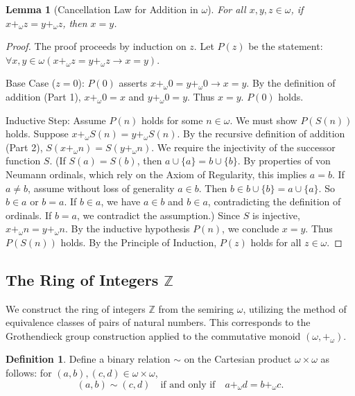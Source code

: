 \documentclass[11pt, a4paper]{article}
\theoremstyle{plain}
\newtheorem{lemma}[theorem]{Lemma}
\theoremstyle{definition}
\newtheorem{definition}[theorem]{Definition}
\numberwithin{equation}{section}
\newcommand{\Z}{\mathbb{Z}}
\begin{document}
\begin{lemma}[Cancellation Law for Addition in $\omega$]\label{lem:cancellation_omega}
For all $x, y, z \in \omega$, if $x+_\omega z = y+_\omega z$, then $x=y$.
\end{lemma}
\begin{proof}
The proof proceeds by induction on $z$.
Let $P(z)$ be the statement: $\forall x, y \in \omega (x+_\omega z = y+_\omega z \rightarrow x=y)$.

Base Case ($z=0$): $P(0)$ asserts $x+_\omega 0 = y+_\omega 0 \rightarrow x=y$. By the definition of addition (Part 1), $x+_\omega 0 = x$ and $y+_\omega 0 = y$. Thus $x=y$. $P(0)$ holds.

Inductive Step: Assume $P(n)$ holds for some $n \in \omega$. We must show $P(S(n))$ holds.
Suppose $x+_\omega S(n) = y+_\omega S(n)$. By the recursive definition of addition (Part 2), $S(x+_\omega n) = S(y+_\omega n)$.
We require the injectivity of the successor function $S$. (If $S(a)=S(b)$, then $a\cup\{a\}=b\cup\{b\}$. By properties of von Neumann ordinals, which rely on the Axiom of Regularity, this implies $a=b$. If $a\neq b$, assume without loss of generality $a \in b$. Then $b \in b\cup\{b\} = a\cup\{a\}$. So $b \in a$ or $b=a$. If $b \in a$, we have $a \in b$ and $b \in a$, contradicting the definition of ordinals. If $b=a$, we contradict the assumption.)
Since $S$ is injective, $x+_\omega n = y+_\omega n$.
By the inductive hypothesis $P(n)$, we conclude $x=y$.
Thus $P(S(n))$ holds.
By the Principle of Induction, $P(z)$ holds for all $z \in \omega$.
\end{proof}

\subsection{The Ring of Integers $\Z$}

We construct the ring of integers $\Z$ from the semiring $\omega$, utilizing the method of equivalence classes of pairs of natural numbers. This corresponds to the Grothendieck group construction applied to the commutative monoid $(\omega, +_\omega)$.

\begin{definition}\label{def:Z_relation}
Define a binary relation $\sim$ on the Cartesian product $\omega \times \omega$ as follows: for $(a, b), (c, d) \in \omega \times \omega$,
\begin{equation}
    (a, b) \sim (c, d) \quad \text{if and only if} \quad a+_\omega d = b+_\omega c.
\end{equation}
\end{definition}
\end{document}
